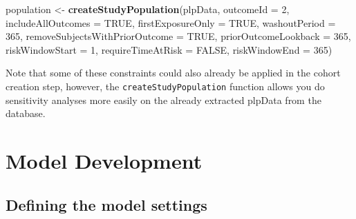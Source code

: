\documentclass[]{article}
\newenvironment{Shaded}{\begin{snugshade}}{\end{snugshade}}
\newcommand{\KeywordTok}[1]{\textcolor[rgb]{0.13,0.29,0.53}{\textbf{#1}}}
\newcommand{\DataTypeTok}[1]{\textcolor[rgb]{0.13,0.29,0.53}{#1}}
\newcommand{\DecValTok}[1]{\textcolor[rgb]{0.00,0.00,0.81}{#1}}
\newcommand{\StringTok}[1]{\textcolor[rgb]{0.31,0.60,0.02}{#1}}
\newcommand{\OtherTok}[1]{\textcolor[rgb]{0.56,0.35,0.01}{#1}}
\newcommand{\NormalTok}[1]{#1}
\begin{document}
\begin{Shaded}
\begin{Highlighting}[]
\NormalTok{population <-}\StringTok{ }\KeywordTok{createStudyPopulation}\NormalTok{(plpData, }
\DataTypeTok{outcomeId =} \DecValTok{2}\NormalTok{, }
\DataTypeTok{includeAllOutcomes =} \OtherTok{TRUE}\NormalTok{, }
\DataTypeTok{firstExposureOnly =} \OtherTok{TRUE}\NormalTok{, }
\DataTypeTok{washoutPeriod =} \DecValTok{365}\NormalTok{, }
\DataTypeTok{removeSubjectsWithPriorOutcome =} \OtherTok{TRUE}\NormalTok{, }
\DataTypeTok{priorOutcomeLookback =} \DecValTok{365}\NormalTok{,}
\DataTypeTok{riskWindowStart =} \DecValTok{1}\NormalTok{,}
\DataTypeTok{requireTimeAtRisk =} \OtherTok{FALSE}\NormalTok{,}
\DataTypeTok{riskWindowEnd =} \DecValTok{365}\NormalTok{)}
\end{Highlighting}
\end{Shaded}

Note that some of these constraints could also already be applied in the
cohort creation step, however, the \texttt{createStudyPopulation}
function allows you do sensitivity analyses more easily on the already
extracted plpData from the database.

\newpage

\section{Model Development}\label{model-development}

\subsection{Defining the model
settings}\label{defining-the-model-settings}
\end{document}
